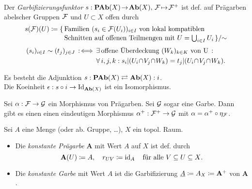 \documentclass{cheat-sheet}
\begin{document}
\begin{defn}
  Der \emph{Garbifizierungsfunktor} $s : \mathbf{PAb}(X) \!\to\! \mathbf{Ab}(X), \, \mathcal{F} \!\mapsto\! \mathcal{F}^+$ ist def. auf Prägarben abelscher Gruppen $\mathcal{F}$ und $U \subset X$ offen durch
  \begin{align*}
    s(\Fais)(U) \coloneqq \{ \, & \text{Familien $(s_i \in \Fais(U_i))_{i \in I}$ von lokal kompatiblen} \\[-2pt]
     & \text{Schnitten auf offenen Teilmengen mit $U = {\bigcup}_{i \in I} \, U_i$} \, \} / {\sim}
  \end{align*}\vspace{-16pt}
  \begin{align*}
    (s_i)_{i \in I} \sim (t_j)_{j \in J} \!\! \coloniff \, & \ex{\text{offene Überdeckung $(W_k)_{k \in K}$ von U}} \\
    & \fa{i, j, k\!}\! s_i|(U_i \!\cap\! V_j \!\cap\! W_k) = t_j|(U_i \!\cap\! V_j \!\cap\! W_k).
  \end{align*}
\end{defn}

\begin{thm}
  Es besteht die Adjunktion \enspace $s : \mathbf{PAb}(X) \rightleftarrows \mathbf{Ab}(X) : i$. \\
  Die Koeinheit $\epsilon : s \circ i \to \operatorname{Id}_{\mathbf{Ab}(X)}$ ist ein Isomorphismus.
\end{thm}

\begin{bem}
  Sei $\alpha : \mathcal{F} \to \mathcal{G}$ ein Morphismus von Prägarben. Sei $\mathcal{G}$ sogar eine Garbe. Dann gibt es einen einen eindeutigen Morphismus $\alpha^+ : \mathcal{F}^+ \to \mathcal{G}$ mit $\alpha = \alpha^+ \circ \eta_{\mathcal{F}}$.
\end{bem}


\begin{defn}
  Sei $A$ eine Menge (oder ab. Gruppe, \ldots), $X$ ein topol. Raum.
  \begin{itemize}
    \item Die \emph{konstante Prägarbe} $\mathbf{A}$ mit Wert $A$ auf $X$ ist def. durch
    \[
      \mathbf{A}(U) \coloneqq A, \quad
      r_{UV} \coloneqq \operatorname{id}_A \quad
      \text{für alle $V \subseteq U \subseteq X$.}
    \]
    \item Die \emph{konstante Garbe} mit Wert $A$ ist die Garbifizierung $\underline{A} \coloneqq A_X \coloneqq \mathbf{A}^+$ von $\mathbf{A}$.
  \end{itemize}
\end{defn}
\end{document}
